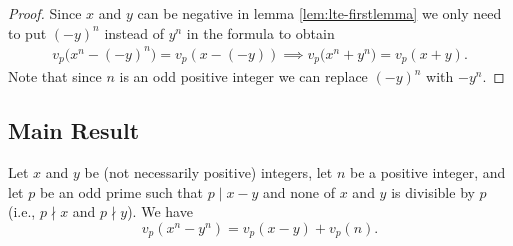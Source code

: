 \documentclass[main.tex]{subfile}
\begin{document}
    \begin{proof}
        Since $x$ and $y$ can be negative in lemma \eqref{lem:lte-firstlemma} we only need to put $(-y)^n$ instead of $y^n$ in the formula to obtain
	         \begin{align*}
		         v_p\big( x^n - (-y)^n \big) = v_p ( x - (-y)) \implies v_p\big(x^n + y^n\big) = v_p(x+y).
	         \end{align*}
        Note that since $n$ is an odd positive integer we can replace $(-y)^n$ with $-y^n$.
    \end{proof}

\subsection{Main Result}

    \begin{theorem}\label{theorem1}
        Let $ x$ and $y$ be (not necessarily positive) integers, let $n$ be a positive integer, and let $p$ be an odd prime such that $ p \mid x - y$ and none of
        $x$ and $y$ is divisible by $p$ (i.e., $p \nmid x$ and $p \nmid y$).  We have
        \[ v_p(  x^n - y^n ) = v_p(  x - y ) + v_p  (n ).\]
    \end{theorem}
\end{document}
